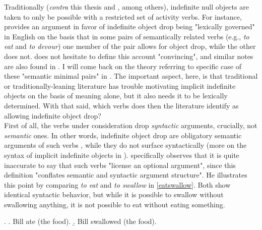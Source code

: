 Traditionally (\textit{contra} this thesis and \textcite[55]{TonelliDelmonte2011}, among others), indefinite null objects are taken to only be possible with a restricted set of activity verbs. For instance, \textcite[510]{Rizzi1986} provides an argument in favor of indefinite object drop being "lexically governed" in English on the basis that in some pairs of semantically related verbs (e.g., \textit{to eat} and \textit{to devour}) one member of the pair allows for object drop, while the other does not. \textcite[236]{Haegeman1987} does not hesitate to define this account "convincing", and similar notes are also found in \textcite{Fillmore1986, Rice1988, Mittwoch2005, Gillon2012}. I will come back on the theory referring to specific case of these "semantic minimal pairs" in . The important aspect, here, is that traditional or traditionally-leaning literature has trouble motivating implicit indefinite objects on the basis of meaning alone, but it also needs it to be lexically determined. With that said, which verbs does then the literature identify as allowing indefinite object drop?\\
First of all, the verbs under consideration drop \textit{syntactic} arguments, crucially, not \textit{semantic} ones. In other words, indefinite object drop are obligatory semantic arguments of such verbs \parencite[120]{Cote1996}, while they do not surface syntactically (more on the syntax of implicit indefinite objects in ). \textcite[134]{Jackendoff2003} specifically observes that it is quite inaccurate to say that such verbs "license an optional argument", since this definition "conflates semantic and syntactic argument structure". He illustrates this point by comparing \textit{to eat} and \textit{to swallow} in \ref{eatswallow}. Both show identical syntactic behavior, but while it is possible to swallow without swallowing anything, it is not possible to eat without eating something.

\ex. \label{eatswallow} \a. \label{eatswallow1} Bill ate (the food).
\b. \label{eatswallow2} Bill swallowed (the food).

